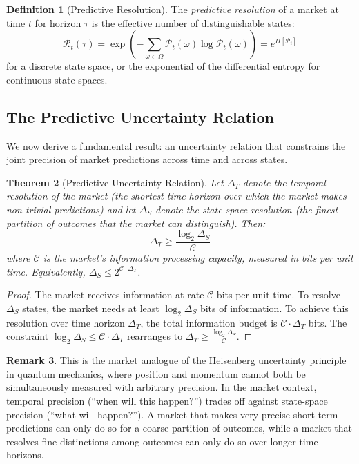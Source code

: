 \documentclass[12pt,a4paper]{article}
\newtheorem{theorem}{Theorem}[section]
\theoremstyle{definition}
\newtheorem{definition}[theorem]{Definition}
\newtheorem{remark}[theorem]{Remark}
\newcommand{\PP}{\mathcal{P}}
\begin{document}
\begin{definition}[Predictive Resolution]\label{def:resolution_quant}
The \emph{predictive resolution} of a market at time $t$ for horizon $\tau$ is the effective number of distinguishable states:
\begin{equation}\label{eq:resolution}
    \mathcal{R}_t(\tau) = \exp\left(-\sum_{\omega \in \Omega} \PP_t(\omega) \log \PP_t(\omega)\right) = e^{H[\PP_t]}
\end{equation}
for a discrete state space, or the exponential of the differential entropy for continuous state spaces.
\end{definition}

\subsection{The Predictive Uncertainty Relation}

We now derive a fundamental result: an uncertainty relation that constrains the joint precision of market predictions across time and across states.

\begin{theorem}[Predictive Uncertainty Relation]\label{thm:uncertainty}
Let $\Delta_T$ denote the temporal resolution of the market (the shortest time horizon over which the market makes non-trivial predictions) and let $\Delta_S$ denote the state-space resolution (the finest partition of outcomes that the market can distinguish). Then:
\begin{equation}\label{eq:uncertainty_relation}
    \Delta_T \geq \frac{\log_2 \Delta_S}{\mathcal{C}}
\end{equation}
where $\mathcal{C}$ is the market's information processing capacity, measured in bits per unit time. Equivalently, $\Delta_S \leq 2^{\mathcal{C} \cdot \Delta_T}$.
\end{theorem}

\begin{proof}
The market receives information at rate $\mathcal{C}$ bits per unit time. To resolve $\Delta_S$ states, the market needs at least $\log_2 \Delta_S$ bits of information. To achieve this resolution over time horizon $\Delta_T$, the total information budget is $\mathcal{C} \cdot \Delta_T$ bits. The constraint $\log_2 \Delta_S \leq \mathcal{C} \cdot \Delta_T$ rearranges to $\Delta_T \geq \frac{\log_2 \Delta_S}{\mathcal{C}}$.
\end{proof}

\begin{remark}
This is the market analogue of the Heisenberg uncertainty principle in quantum mechanics, where position and momentum cannot both be simultaneously measured with arbitrary precision. In the market context, temporal precision (``when will this happen?'') trades off against state-space precision (``what will happen?''). A market that makes very precise short-term predictions can only do so for a coarse partition of outcomes, while a market that resolves fine distinctions among outcomes can only do so over longer time horizons.
\end{remark}
\end{document}
